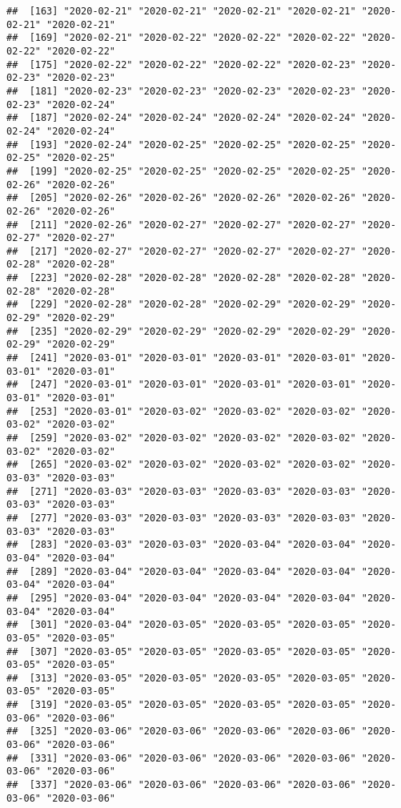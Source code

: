 \documentclass{article}\usepackage[]{graphicx}\usepackage[]{xcolor}
\makeatletter
\newenvironment{kframe}{%
 \def\at@end@of@kframe{}%
 \ifinner\ifhmode%
  \def\at@end@of@kframe{\end{minipage}}%
  \begin{minipage}{\columnwidth}%
 \fi\fi%
 \def\FrameCommand##1{\hskip\@totalleftmargin \hskip-\fboxsep
 \colorbox{shadecolor}{##1}\hskip-\fboxsep
     \hskip-\linewidth \hskip-\@totalleftmargin \hskip\columnwidth}%
 \MakeFramed {\advance\hsize-\width
   \@totalleftmargin\z@ \linewidth\hsize
   \@setminipage}}%
 {\par\unskip\endMakeFramed%
 \at@end@of@kframe}
\newenvironment{knitrout}{}{} %
\makeatother
\begin{document}
\begin{knitrout}
\begin{kframe}
\begin{verbatim}
##  [163] "2020-02-21" "2020-02-21" "2020-02-21" "2020-02-21" "2020-02-21" "2020-02-21"
##  [169] "2020-02-21" "2020-02-22" "2020-02-22" "2020-02-22" "2020-02-22" "2020-02-22"
##  [175] "2020-02-22" "2020-02-22" "2020-02-22" "2020-02-23" "2020-02-23" "2020-02-23"
##  [181] "2020-02-23" "2020-02-23" "2020-02-23" "2020-02-23" "2020-02-23" "2020-02-24"
##  [187] "2020-02-24" "2020-02-24" "2020-02-24" "2020-02-24" "2020-02-24" "2020-02-24"
##  [193] "2020-02-24" "2020-02-25" "2020-02-25" "2020-02-25" "2020-02-25" "2020-02-25"
##  [199] "2020-02-25" "2020-02-25" "2020-02-25" "2020-02-25" "2020-02-26" "2020-02-26"
##  [205] "2020-02-26" "2020-02-26" "2020-02-26" "2020-02-26" "2020-02-26" "2020-02-26"
##  [211] "2020-02-26" "2020-02-27" "2020-02-27" "2020-02-27" "2020-02-27" "2020-02-27"
##  [217] "2020-02-27" "2020-02-27" "2020-02-27" "2020-02-27" "2020-02-28" "2020-02-28"
##  [223] "2020-02-28" "2020-02-28" "2020-02-28" "2020-02-28" "2020-02-28" "2020-02-28"
##  [229] "2020-02-28" "2020-02-28" "2020-02-29" "2020-02-29" "2020-02-29" "2020-02-29"
##  [235] "2020-02-29" "2020-02-29" "2020-02-29" "2020-02-29" "2020-02-29" "2020-02-29"
##  [241] "2020-03-01" "2020-03-01" "2020-03-01" "2020-03-01" "2020-03-01" "2020-03-01"
##  [247] "2020-03-01" "2020-03-01" "2020-03-01" "2020-03-01" "2020-03-01" "2020-03-01"
##  [253] "2020-03-01" "2020-03-02" "2020-03-02" "2020-03-02" "2020-03-02" "2020-03-02"
##  [259] "2020-03-02" "2020-03-02" "2020-03-02" "2020-03-02" "2020-03-02" "2020-03-02"
##  [265] "2020-03-02" "2020-03-02" "2020-03-02" "2020-03-02" "2020-03-03" "2020-03-03"
##  [271] "2020-03-03" "2020-03-03" "2020-03-03" "2020-03-03" "2020-03-03" "2020-03-03"
##  [277] "2020-03-03" "2020-03-03" "2020-03-03" "2020-03-03" "2020-03-03" "2020-03-03"
##  [283] "2020-03-03" "2020-03-03" "2020-03-04" "2020-03-04" "2020-03-04" "2020-03-04"
##  [289] "2020-03-04" "2020-03-04" "2020-03-04" "2020-03-04" "2020-03-04" "2020-03-04"
##  [295] "2020-03-04" "2020-03-04" "2020-03-04" "2020-03-04" "2020-03-04" "2020-03-04"
##  [301] "2020-03-04" "2020-03-05" "2020-03-05" "2020-03-05" "2020-03-05" "2020-03-05"
##  [307] "2020-03-05" "2020-03-05" "2020-03-05" "2020-03-05" "2020-03-05" "2020-03-05"
##  [313] "2020-03-05" "2020-03-05" "2020-03-05" "2020-03-05" "2020-03-05" "2020-03-05"
##  [319] "2020-03-05" "2020-03-05" "2020-03-05" "2020-03-05" "2020-03-06" "2020-03-06"
##  [325] "2020-03-06" "2020-03-06" "2020-03-06" "2020-03-06" "2020-03-06" "2020-03-06"
##  [331] "2020-03-06" "2020-03-06" "2020-03-06" "2020-03-06" "2020-03-06" "2020-03-06"
##  [337] "2020-03-06" "2020-03-06" "2020-03-06" "2020-03-06" "2020-03-06" "2020-03-06"

\end{verbatim}
\end{kframe}
\end{knitrout}
\end{document}
